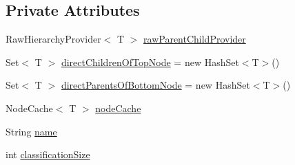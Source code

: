 \subsection*{Private Attributes}
\begin{DoxyCompactItemize}
\item 
Raw\-Hierarchy\-Provider$<$ T $>$ \hyperlink{classorg_1_1semanticweb_1_1owlapi_1_1reasoner_1_1structural_1_1_structural_reasoner_1_1_hierarch7d8ade138c58c437609a51314b153fe1_a8c9b9e46034c5a8ed13b731f455d22b5}{raw\-Parent\-Child\-Provider}
\item 
Set$<$ T $>$ \hyperlink{classorg_1_1semanticweb_1_1owlapi_1_1reasoner_1_1structural_1_1_structural_reasoner_1_1_hierarch7d8ade138c58c437609a51314b153fe1_a2b7a2925cb0de4b39bcdc13c957cc7f3}{direct\-Children\-Of\-Top\-Node} = new Hash\-Set$<$T$>$()
\item 
Set$<$ T $>$ \hyperlink{classorg_1_1semanticweb_1_1owlapi_1_1reasoner_1_1structural_1_1_structural_reasoner_1_1_hierarch7d8ade138c58c437609a51314b153fe1_a7bc0005010eb2fdcecc1a890ccf802b0}{direct\-Parents\-Of\-Bottom\-Node} = new Hash\-Set$<$T$>$()
\item 
Node\-Cache$<$ T $>$ \hyperlink{classorg_1_1semanticweb_1_1owlapi_1_1reasoner_1_1structural_1_1_structural_reasoner_1_1_hierarch7d8ade138c58c437609a51314b153fe1_a0698fd48aeb9fcfecc3fe71ae7c6b089}{node\-Cache}
\item 
String \hyperlink{classorg_1_1semanticweb_1_1owlapi_1_1reasoner_1_1structural_1_1_structural_reasoner_1_1_hierarch7d8ade138c58c437609a51314b153fe1_ad1112099a477ba419c5fd321ee18254c}{name}
\item 
int \hyperlink{classorg_1_1semanticweb_1_1owlapi_1_1reasoner_1_1structural_1_1_structural_reasoner_1_1_hierarch7d8ade138c58c437609a51314b153fe1_ae3bfdd510124845776771b1b7bfdd376}{classification\-Size}
\end{DoxyCompactItemize}


